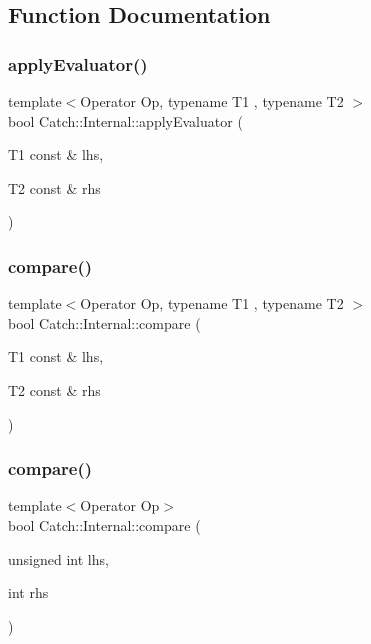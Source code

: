 \subsection{Function Documentation}
\mbox{\label{namespace_catch_1_1_internal_a3849d993997f2b708281ff02e77dfecf}} 
\subsubsection{apply\+Evaluator()}
{\footnotesize\ttfamily template$<$Operator Op, typename T1 , typename T2 $>$ \\
bool Catch\+::\+Internal\+::apply\+Evaluator (\begin{DoxyParamCaption}\item[{T1 const \&}]{lhs,  }\item[{T2 const \&}]{rhs }\end{DoxyParamCaption})}

\mbox{\label{namespace_catch_1_1_internal_a64ae04769c4583b9d4027c792b496c7d}} 
\subsubsection{compare()\hspace{0.1cm}{\footnotesize\ttfamily [1/17]}}
{\footnotesize\ttfamily template$<$Operator Op, typename T1 , typename T2 $>$ \\
bool Catch\+::\+Internal\+::compare (\begin{DoxyParamCaption}\item[{T1 const \&}]{lhs,  }\item[{T2 const \&}]{rhs }\end{DoxyParamCaption})}

\mbox{\label{namespace_catch_1_1_internal_a171aec1826898b877980a2b15fe5f735}} 
\subsubsection{compare()\hspace{0.1cm}{\footnotesize\ttfamily [2/17]}}
{\footnotesize\ttfamily template$<$Operator Op$>$ \\
bool Catch\+::\+Internal\+::compare (\begin{DoxyParamCaption}\item[{unsigned int}]{lhs,  }\item[{int}]{rhs }\end{DoxyParamCaption})}

